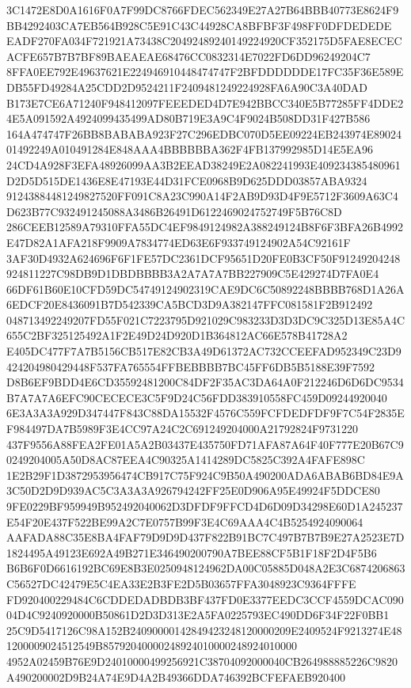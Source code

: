 \documentclass[UTF8,fontset=fandol,zihao=-4,a4paper]{ctexart}
\begin{document}
{{3C1472E8D0A1616F0A7F99DC8766FDEC562349E27A27B64BBB40773E8624F9BB4292403CA7EB564B928C5E91C43C44928CA8BFBF3F498FF0DFDEDEDE
EADF270FA034F721921A73438C20492489240149224920CF352175D5FAE8ECECACFE657B7B7BF89BAEAEAE68476CC0832314E7022FD6DD96249204C7
8FFA0EE792E49637621E224946910448474747F2BFDDDDDDE17FC35F36E589EDB55FD49284A25CDD2D9524211F2409481249224928FA6A90C3A40DAD
B173E7CE6A71240F948412097FEEEDED4D7E942BBCC340E5B77285FF4DDE24E5A091592A4924099435499AD80B719E3A9C4F9024B508DD31F427B586
164A474747F26BB8BABABA923F27C296EDBC070D5EE09224EB243974E8902401492249A010491284E848AAA4BBBBBBA362F4FB137992985D14E5EA96
24CD4A928F3EFA48926099AA3B2EEAD38249E2A082241993E409234385480961D2D5D515DE1436E8E47193E44D31FCE0968B9D625DDD03857ABA9324
91243884481249827520FF091C8A23C990A14F2AB9D93D4F9E5712F3609A63C4D623B77C932491245088A3486B26491D6122469024752749F5B76C8D
286CEEB12589A79310FFA55DC4EF9849124982A388249124B8F6F3BFA26B4992E47D82A1AFA218F9909A7834774ED63E6F933749124902A54C92161F
3AF30D4932A624696F6F1FE57DC2361DCF95651D20FE0B3CF50F91249204248924811227C98DB9D1DBDBBBB3A2A7A7A7BB227909C5E429274D7FA0E4
66DF61B60E10CFD59DC54749124902319CAE9DC6C50892248BBBB768D1A26A6EDCF20E8436091B7D542339CA5BCD3D9A382147FFC081581F2B912492
048713492249207FD55F021C7223795D921029C983233D3D3DC9C325D13E85A4C655C2BF325125492A1F2E49D24D920D1B364812AC66E578B41728A2
E405DC477F7A7B5156CB517E82CB3A49D61372AC732CCEEFAD952349C23D9424204980429448F537FA765554FFBEBBBB7BC45FF6DB5B5188E39F7592
D8B6EF9BDD4E6CD35592481200C84DF2F35AC3DA64A0F212246D6D6DC9534B7A7A7A6EFC90CECECE3C5F9D24C56FDD383910558FC459D09244920040
6E3A3A3A929D347447F843C88DA15532F4576C559FCFDEDFDF9F7C54F2835EF984497DA7B5989F3E4CC97A24C2C691249204000A21792824F9731220
437F9556A88FEA2FE01A5A2B03437E435750FD71AFA87A64F40F777E20B67C90249204005A50D8AC87EEA4C90325A1414289DC5825C392A4FAFE898C
1E2B29F1D3872953956474CB917C75F924C9B50A490200ADA6ABAB6BD84E9A3C50D2D9D939AC5C3A3A3A926794242FF25E0D906A95E49924F5DDCE80
9FE0229BF959949B952492040062D3DFDF9FFCD4D6D09D34298E60D1A245237E54F20E437F522BE99A2C7E0757B99F3E4C69AAA4C4B5254924090064
AAFADA88C35E8BA4FAF79D9D9D437F822B91BC7C497B7B7B9E27A2523E7D1824495A49123E692A49B271E346490200790A7BEE88CF5B1F18F2D4F5B6
B6B6F0D6616192BC69E8B3E0250948124962DA00C05885D048A2E3C6874206863C56527DC42479E5C4EA33E2B3FE2D5B03657FFA3048923C9364FFFE
FD920400229484C6CDDEDADBDB3BF437FD0E3377EEDC3CCF4559DCAC09004D4C9240920000B50861D2D3D313E2A5FA0225793EC490DD6F34F22F0BB1
25C9D5417126C98A152B24090000142849423248120000209E2409524F9213274E481200009024512549B85792040000248924010000248924010000
4952A02459B76E9D24010000499256921C38704092000040CB264988885226C9820A490200002D9B24A74E9D4A2B49366DDA746392BCFEFAEB920400
}}
\end{document}
